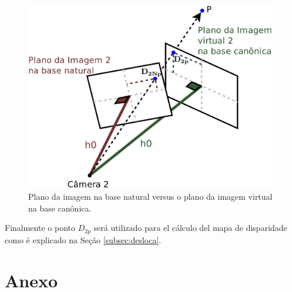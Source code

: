 \documentclass[a4paper,10pt]{article}
\begin{document}
\begin{figure}[!]
\center
 \includegraphics[width=11.0cm]{./images/cambiodebase.eps}
\caption{Plano da imagem na base natural versus o plano da imagem virtual na base canônica.}
\label{fig:cambiodebase}
\end{figure} 

Finalmente o ponto $D_{2p}$ será utilizado para el cálculo del mapa de disparidade
como é explicado na Seção \ref{subsec:desloca}.




\section{Anexo}
\end{document}

